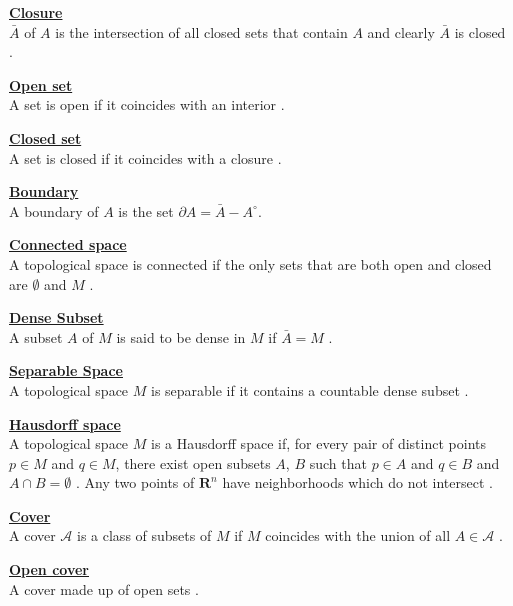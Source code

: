 \documentclass[twocolumn]{article}
\newenvironment{defit}[1]
  {\noindent{$\bullet$}\underline{\textbf{#1}}\\}
  {\\}
\begin{document}
\begin{defit}{Closure}
${\bar A}$ of $A$ is the intersection of all closed 
sets that contain $A$ and clearly ${\bar A}$ is closed 
\cite{love_rund}.
\end{defit}

\begin{defit}{Open set}
A set is open if it coincides with an interior 
\cite{love_rund}.
\end{defit}

\begin{defit}{Closed set}
A set is closed if it coincides with a closure 
\cite{love_rund}.
\end{defit}

\begin{defit}{Boundary}
A boundary of $A$ is the set $\partial A = {\bar A} 
- {A}^{\circ}$\cite{love_rund}.
\end{defit}

\begin{defit}{Connected space}
A topological space is connected if the only 
sets that are both open and closed are $\emptyset$ and $M$ 
\cite{love_rund}.
\end{defit}

\begin{defit}{Dense Subset}
A subset $A$ of $M$ is said to be dense in $M$ if 
$\bar A = M$ \cite{love_rund}.
\end{defit}

\begin{defit}{Separable Space}
A topological space $M$ is separable if it contains 
a countable dense subset \cite{love_rund}.
\end{defit}

\begin{defit}{Hausdorff space}
A topological space $M$ is a Hausdorff space if, 
for every pair of distinct points $p \in M$ and $q \in M$, there exist 
open subsets $A$, $B$ such that $p \in A$ and $q \in B$ and 
$A \cap B = \emptyset$ 
\cite{love_rund}.  Any two points of $\mathbf{R}^{n}$ have 
neighborhoods which do not intersect \cite{schutz80}.
\end{defit}

\begin{defit}{Cover}
A cover $\mathcal{A}$ is a class of subsets of $M$ if 
$M$ coincides with the union of all $A \in \mathcal{A}$ 
\cite{love_rund}.
\end{defit}

\begin{defit}{Open cover}
A cover made up of open sets \cite{love_rund}.
\end{defit}
\end{document}
